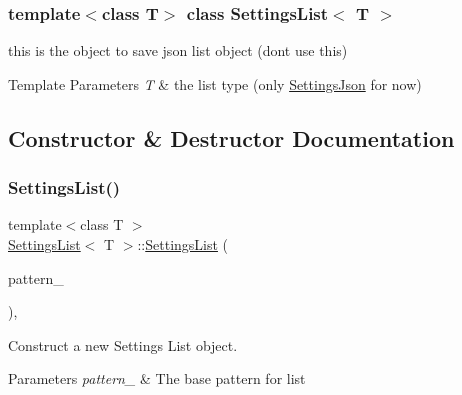 \subsubsection*{template$<$class T$>$\newline
class Settings\+List$<$ T $>$}

this is the object to save json list object (dont use this) 


\begin{DoxyTemplParams}{Template Parameters}
{\em T} & the list type (only \hyperlink{class_settings_json}{Settings\+Json} for now) \\
\hline
\end{DoxyTemplParams}


\subsection{Constructor \& Destructor Documentation}
\mbox{\label{class_settings_list_a9ea36eb5d00258d66eac568c9ddc134a}} 
\subsubsection{\texorpdfstring{Settings\+List()}{SettingsList()}\hspace{0.1cm}{\footnotesize\ttfamily [1/2]}}
{\footnotesize\ttfamily template$<$class T $>$ \\
\hyperlink{class_settings_list}{Settings\+List}$<$ T $>$\+::\hyperlink{class_settings_list}{Settings\+List} (\begin{DoxyParamCaption}\item[{T $\ast$}]{pattern\+\_\+ }\end{DoxyParamCaption})\hspace{0.3cm}{\ttfamily [inline]}, {\ttfamily [explicit]}}



Construct a new Settings List object. 


\begin{DoxyParams}{Parameters}
{\em pattern\+\_\+} & The base pattern for list \\
\hline
\end{DoxyParams}
\mbox{\label{class_settings_list_a6481d0b54c16db6368fe32f60a81dfeb}} 
